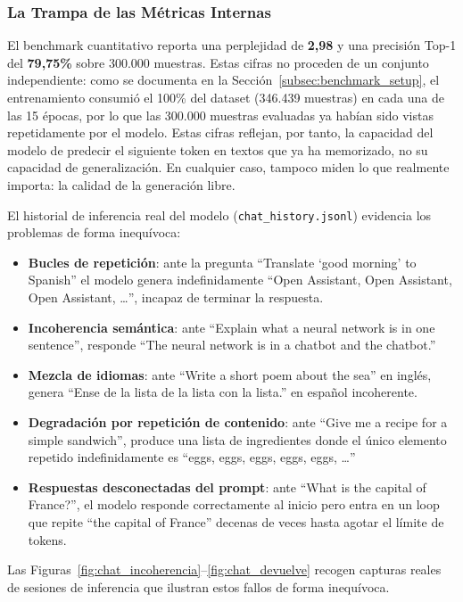 \subsubsection{La Trampa de las Métricas Internas}

El benchmark cuantitativo reporta una perplejidad de \textbf{2,98} y una precisión Top-1 del \textbf{79,75\%} sobre 300.000 muestras. Estas cifras no proceden de un conjunto independiente: como se documenta en la Sección~\ref{subsec:benchmark_setup}, el entrenamiento consumió el 100\% del dataset (346.439 muestras) en cada una de las 15 épocas, por lo que las 300.000 muestras evaluadas ya habían sido vistas repetidamente por el modelo. Estas cifras reflejan, por tanto, la capacidad del modelo de predecir el siguiente token en textos que ya ha memorizado, no su capacidad de generalización. En cualquier caso, tampoco miden lo que realmente importa: la calidad de la generación libre.

El historial de inferencia real del modelo (\texttt{chat\_history.jsonl}) evidencia los problemas de forma inequívoca:

\begin{itemize}
    \item \textbf{Bucles de repetición}: ante la pregunta ``Translate `good morning' to Spanish'' el modelo genera indefinidamente ``Open Assistant, Open Assistant, Open Assistant, \ldots'', incapaz de terminar la respuesta.
    \item \textbf{Incoherencia semántica}: ante ``Explain what a neural network is in one sentence'', responde ``The neural network is in a chatbot and the chatbot.''
    \item \textbf{Mezcla de idiomas}: ante ``Write a short poem about the sea'' en inglés, genera ``Ense de la lista de la lista con la lista.'' en español incoherente.
    \item \textbf{Degradación por repetición de contenido}: ante ``Give me a recipe for a simple sandwich'', produce una lista de ingredientes donde el único elemento repetido indefinidamente es ``eggs, eggs, eggs, eggs, eggs, \ldots''
    \item \textbf{Respuestas desconectadas del prompt}: ante ``What is the capital of France?'', el modelo responde correctamente al inicio pero entra en un loop que repite ``the capital of France'' decenas de veces hasta agotar el límite de tokens.
\end{itemize}

Las Figuras~\ref{fig:chat_incoherencia}--\ref{fig:chat_devuelve} recogen capturas reales de sesiones de inferencia que ilustran estos fallos de forma inequívoca.

